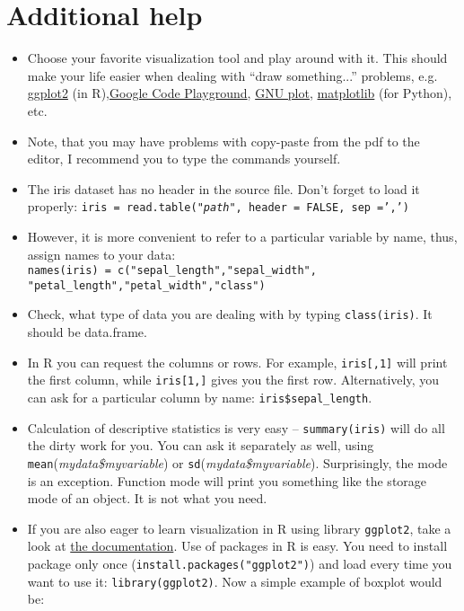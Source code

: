 \documentclass{article}
\begin{document}
\section*{Additional help}
\begin{itemize}
\item Choose your favorite visualization tool and play around with it. This should make your life easier when dealing with ``draw something...'' problems, e.g. \href{http://docs.ggplot2.org/current/}{ggplot2} (in R),\href{https://code.google.com/apis/ajax/playground/?type=visualization#motion_chart}{Google Code Playground}, \href{http://www.gnuplot.info/}{GNU plot}, \href{http://matplotlib.org/}{matplotlib} (for Python), etc.

\item Note, that you may have problems with copy-paste from the pdf to the editor, I recommend you to type the commands yourself. 
\item The iris dataset has no header in the source file. Don't forget to load it properly: \texttt{iris = read.table(\emph{"path"}, header = FALSE, sep =',')}
\item However, it is more convenient to refer to a particular variable by name, thus, assign names to your data:\\
\texttt{names(iris) = c("sepal\_length","sepal\_width",\\"petal\_length","petal\_width","class")} 
\item Check, what type of data you are dealing with by typing \texttt{class(iris)}. It should be data.frame.
\item In R you can request the columns or rows. For example, \texttt{iris[,1]} will print the first column, while \texttt{iris[1,]} gives you the first row. Alternatively, you can ask for a particular column by name: \texttt{iris\$sepal\_length}.
\item Calculation of descriptive statistics is very easy -- \texttt{summary(iris)} will do all the dirty work for you. You can ask it separately as well, using \texttt{mean}(\emph{mydata\$myvariable}) or \texttt{sd}(\emph{mydata\$myvariable}). Surprisingly, the mode is an exception. Function mode will print you something like the storage mode of an object. It is not what you need.
\item If you are also eager to learn  visualization in R using library \texttt{ggplot2}, take a look at \href{http://docs.ggplot2.org/current/}{the documentation}. Use of packages in R is easy. You need to install package only once (\texttt{install.packages("ggplot2")}) and load every time you want to use it: \texttt{library(ggplot2)}. Now a simple example of boxplot would be:

\end{itemize}
\end{document}
